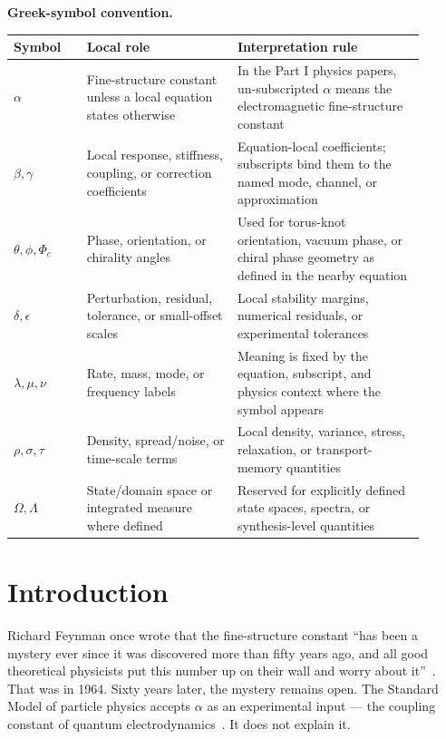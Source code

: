 \documentclass[11pt]{article}
\begin{document}
\noindent\textbf{Greek-symbol convention.}
\begin{center}
{\small
\begin{tabular}{p{0.16\linewidth}p{0.33\linewidth}p{0.41\linewidth}}
\hline
Symbol & Local role & Interpretation rule \\
\hline
$\alpha$ & Fine-structure constant unless a local equation states otherwise & In the Part I physics papers, un-subscripted $\alpha$ means the electromagnetic fine-structure constant \\
$\beta,\gamma$ & Local response, stiffness, coupling, or correction coefficients & Equation-local coefficients; subscripts bind them to the named mode, channel, or approximation \\
$\theta,\phi,\Phi_c$ & Phase, orientation, or chirality angles & Used for torus-knot orientation, vacuum phase, or chiral phase geometry as defined in the nearby equation \\
$\delta,\epsilon$ & Perturbation, residual, tolerance, or small-offset scales & Local stability margins, numerical residuals, or experimental tolerances \\
$\lambda,\mu,\nu$ & Rate, mass, mode, or frequency labels & Meaning is fixed by the equation, subscript, and physics context where the symbol appears \\
$\rho,\sigma,\tau$ & Density, spread/noise, or time-scale terms & Local density, variance, stress, relaxation, or transport-memory quantities \\
$\Omega,\Lambda$ & State/domain space or integrated measure where defined & Reserved for explicitly defined state spaces, spectra, or synthesis-level quantities \\
\hline
\end{tabular}
}
\end{center}


\section{Introduction}

Richard Feynman once wrote that the fine-structure constant ``has been a mystery
ever since it was discovered more than fifty years ago, and all good theoretical
physicists put this number up on their wall and worry about it''~\cite{Feynman1964}.
That was in 1964. Sixty years later, the mystery remains open. The
Standard Model of particle physics accepts $\alpha$ as an experimental input --- the
coupling constant of quantum electrodynamics~\cite{Schwinger1948}. It
does not explain it.
\end{document}
